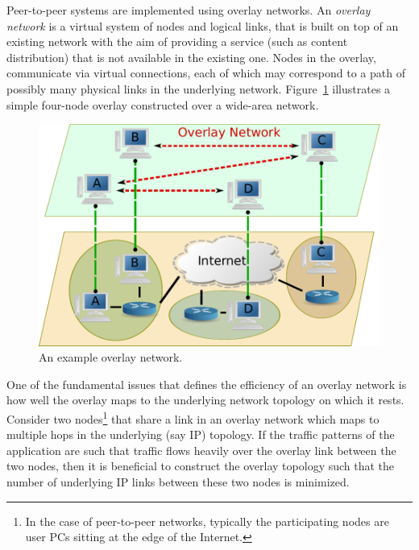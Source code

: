 Peer-to-peer systems are implemented using overlay networks. An \emph{overlay
network} is a virtual system of nodes and logical links, that is built on top of
an existing network with the aim of providing a service (such as content
distribution) that is not available in the existing one. Nodes in the overlay,
communicate via virtual connections, each of which may correspond to a path of
possibly many physical links in the underlying network.
Figure~\ref{figure:overlay} illustrates a simple four-node overlay constructed
over a wide-area network.

\begin{figure}
\centering
  \includegraphics[scale=0.5]{img/p2p.pdf}
\caption{An example overlay network.}
\label{figure:overlay}
\end{figure}

One of the fundamental issues that defines the efficiency of an overlay network
is how well the overlay maps to the underlying network topology on which it
rests. Consider two nodes\footnote{In the case of peer-to-peer networks,
typically the participating nodes are user PCs sitting at the edge of the
Internet.} that share a link in an overlay network which maps to multiple hops
in the underlying (say IP) topology. If the traffic patterns of the application
are such that traffic flows heavily over the overlay link between the two nodes,
then it is beneficial to construct the overlay topology such that the number of
underlying IP links between these two nodes is minimized.

